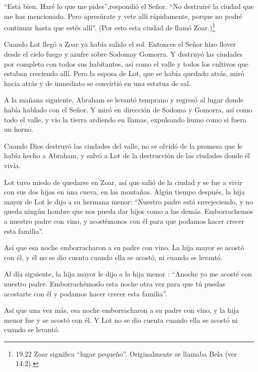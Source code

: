  ``Está bien. Haré lo que me pides'',respondió el Señor.
``No destruiré la ciudad que me has mencionado.  Pero
apresúrate y vete allí rápidamente, porque no podré continuar hasta que
estés allí''. (Por esto esta ciudad de llamó Zoar.)\footnote{19.22 Zoar
  significa ``lugar pequeño''. Originalmente se llamaba Bela (ver 14:2).}

 Cuando Lot llegó a Zoar ya había salido el sol.
 Entonces el Señor hizo llover desde el cielo fuego y
azufre sobre Sodomay Gomorra.  Y destruyó las ciudades por
completo con todos sus habitantes, así como el valle y todos los
cultivos que estaban creciendo allí.  Pero la esposa de
Lot, que se había quedado atrás, miró hacia atrás y de inmediato se
convirtió en una estatua de sal.

 A la mañana siguiente, Abraham se levantó temprano y
regresó al lugar donde había hablado con el Señor.  Y miró
en dirección de Sodoma y Gomorra, así como todo el valle, y vio la
tierra ardiendo en llamas, expulsando humo como si fuera un horno.

 Cuando Dios destruyó las ciudades del valle, no se olvidó
de la promesa que le había hecho a Abraham, y salvó a Lot de la
destrucción de las ciudades donde él vivía.

 Lot tuvo miedo de quedarse en Zoar, así que salió de la
ciudad y se fue a vivir con sus dos hijas en una cueva, en las montañas.
 Algún tiempo después, la hija mayor de Lot le dijo a su
hermana menor: ``Nuestro padre está envejeciendo, y no queda ningún
hombre que nos pueda dar hijos como a las demás. 
Emborrachemos a nuestro padre con vino, y acostémonos con él para que
podamos hacer crecer esta familia''.

 Así que esa noche emborracharon a su padre con vino. La
hija mayor se acostó con él, y él no se dio cuenta cuando ella se
acostó, ni cuando se levantó.

 Al día siguiente, la hija mayor le dijo a la hija menor :
``Anoche yo me acosté con nuestro padre. Emborrachémoslo esta noche otra
vez para que tú puedas acostarte con él y podamos hacer crecer esta
familia''.

 Así que una vez más, esa noche emborracharon a su padre
con vino, y la hija menor fue y se acostó con él. Y Lot no se dio cuenta
cuando ella se acostó ni cuando se levantó.

